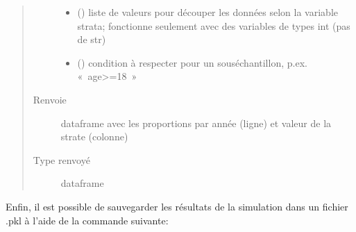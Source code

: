 \documentclass[letterpaper,10pt,french]{sphinxmanual}
\begin{document}
\begin{fulllineitems}
\begin{fulllineitems}
\begin{quote}
\begin{description}
\begin{itemize}
\item {} 
 () \textendash{} liste de valeurs pour découper les données selon la variable strata; fonctionne seulement avec des variables de types int (pas de str)

\item {} 
 () \textendash{} condition à respecter pour un sous\sphinxhyphen{}échantillon, p.ex. « age\textgreater{}=18 »

\end{itemize}

\item[{Renvoie}] \leavevmode
dataframe avec les proportions par année (ligne) et valeur de la strate (colonne)

\item[{Type renvoyé}] \leavevmode
dataframe

\end{description}\end{quote}

\end{fulllineitems}


\end{fulllineitems}


\begin{DUlineblock}{0em}
\item[] 
\end{DUlineblock}


Enfin, il est possible de sauvegarder les résultats de la simulation dans un fichier .pkl à l’aide de la commande suivante:

\begin{sphinxVerbatim}[commandchars=\\\{\}]
\end{sphinxVerbatim}

\end{document}
